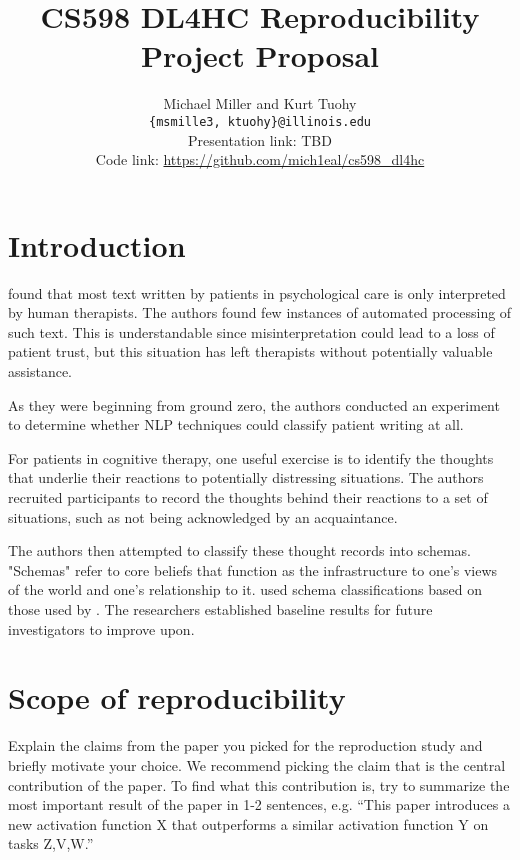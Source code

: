 \documentclass[11pt,a4paper]{article}
\title{CS598 DL4HC Reproducibility Project Proposal}
\author{Michael Miller and Kurt Tuohy \\
  \texttt{\{msmille3, ktuohy\}@illinois.edu}
  \\[2em]
  Presentation link: TBD\url{} \\
  Code link: \url{https://github.com/mich1eal/cs598_dl4hc}}
\begin{document}
\maketitle


\section{Introduction}

\citeauthor{burger_2021} found that most text written by patients in psychological care is only interpreted by human therapists. The authors found few instances of automated processing of such text. This is understandable since misinterpretation could lead to a loss of patient trust, but this situation has left therapists without potentially valuable assistance.

As they were beginning from ground zero, the authors conducted an experiment to determine whether NLP techniques could classify patient writing at all.

For patients in cognitive therapy, one useful exercise is to identify the thoughts that underlie their reactions to potentially distressing situations. The authors recruited participants to record the thoughts behind their reactions to a set of situations, such as not being acknowledged by an acquaintance.

The authors then attempted to classify these thought records into schemas. "Schemas" refer to core beliefs that function as the infrastructure to one's views of the world and one's relationship to it. \cite{burger_2021} used schema classifications based on those used by \citeauthor{millings_2015}. The researchers established baseline results for future investigators to improve upon.

\section{Scope of reproducibility}

Explain the claims from the paper you picked for the reproduction study and briefly motivate your choice. We recommend picking the claim that is the central contribution of the paper. To find what this contribution is, try to summarize the most important result of the paper in 1-2 sentences, e.g. ``This paper introduces a new activation function X that outperforms a similar activation function Y on tasks Z,V,W.'' 
\end{document}
